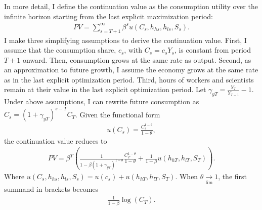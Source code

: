 In more detail, I define the continuation value as the consumption utility over the infinite horizon starting from the last explicit maximization period:
\begin{align*}
	PV=\sum_{s=T+1}^{\infty} \beta^{s}u(C_s, h_{hs}, h_{ls}, S_{s}).
\end{align*}
I make three simplifying assumptions to derive the continuation value. First, 
I assume that the consumption share, $c_s$, with $C_s=c_sY_s$, is constant from period $T+1$ onward.  Then, consumption grows at the same rate as output. 
Second, as an approximation to future growth, I assume the economy grows at the same rate as in the last explicit optimization period. Third, hours of workers and scientists remain at their value in the last explicit optimization period. %
Let $\gamma_{yT}=\frac{Y_{T}}{Y_{T-1}}-1$. Under above assumptions, I can rewrite future consumption as $C_s=(1+\gamma_{yT})^{s-T}C_{T}$.
Given the functional form
\begin{align*}
	u(C_s)= \frac{C_s^{1-\theta}}{1-\theta},
\end{align*}
the continuation value reduces to
\begin{align*}
	PV= \beta^{T}\left(\frac{1}{1-\beta (1+\gamma_{yT})^{1-\theta}}\frac{C_{T}^{1-\theta}}{1-\theta}+ \frac{1}{1-\beta}u(h_{hT}, h_{lT}, S_T)\right).
\end{align*}
Where $u(C_s, h_{hs}, h_{ls}, S_{s})=u(c_s)+u(h_{hT}, h_{lT}, S_T)$.
When $\theta\underset{\lim}{\rightarrow} 1$,  the first summand in brackets becomes
\begin{align*}
	\frac{1}{1-\beta}\log(C_{T}).
\end{align*}



